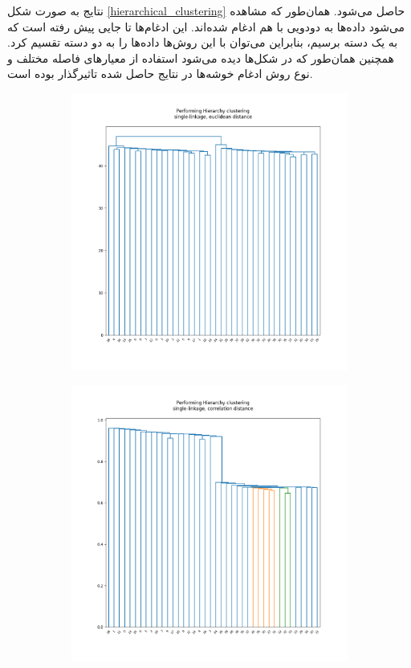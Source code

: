\documentclass[12pt, a4paper]{article}
\begin{document}
نتایج به صورت شکل \ref{hierarchical_clustering} حاصل می‌شود. همان‌طور که مشاهده می‌شود
داده‌ها به دودویی با هم ادغام شده‌اند. این ادغام‌ها تا جایی پیش رفته است که به یک دسته
برسیم، بنابراین می‌توان با این روش‌ها داده‌ها را به دو دسته تقسیم کرد. همچنین
همان‌طور که در شکل‌ها دیده می‌شود استفاده از معیار‌های فاصله مختلف و نوع روش ادغام خوشه‌ها
در نتایج حاصل شده تاثیرگذار بوده است.

\begin{figure}[h]
    \begin{subfigure}{0.45\linewidth}
        \includegraphics[width=\linewidth]{images/q3/d/single_euclidean.png}
    \end{subfigure}
    \hfill
    \begin{subfigure}{0.45\linewidth}
        \includegraphics[width=\linewidth]{images/q3/d/single_correlation.png}

\end{subfigure}
\end{figure}
\end{document}
